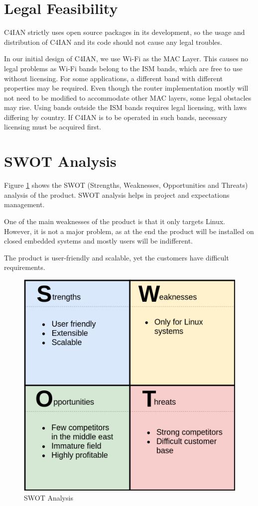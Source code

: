\section{Legal Feasibility}

\quad C4IAN strictly uses open source packages in its development, so the usage and distribution of C4IAN and its code should not cause any legal troubles.

In our initial design of C4IAN, we use Wi-Fi as the MAC Layer. This causes no legal problems as Wi-Fi bands belong to the ISM bands, which are free to use without licensing. For some applications, a different band with different properties may be required. Even though the router implementation mostly will not need to be modified to accommodate other MAC layers, some legal obstacles may rise. Using bands outside the ISM bands requires legal licensing, with laws differing by country. If C4IAN is to be operated in such bands, necessary licensing must be acquired first.

\section{SWOT Analysis}
Figure \ref{fig:swot} shows the SWOT (Strengths, Weaknesses, Opportunities and Threats) analysis of the product.
SWOT analysis helps in project and expectations management.

One of the main weaknesses of the product is that it only targets Linux.
However, it is not a major problem, as at the end the product will be installed on closed embedded systems and mostly users will be indifferent.

The product is user-friendly and scalable, yet the customers have difficult requirements.

\begin{figure}[!htb]
    \centering
    \includegraphics[width=0.6\linewidth]{images/swot.png}
    \caption{SWOT Analysis}
    \label{fig:swot}
\end{figure}